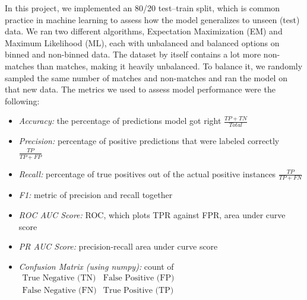 \documentclass{article}
\begin{document}
In this project, we implemented an 80/20 test–train split, which is common practice in machine learning to assess how the model generalizes to unseen (test) data. We ran two different algorithms, Expectation Maximization (EM) and Maximum Likelihood (ML), each with unbalanced and balanced options on binned and non-binned data. The dataset by itself contains a lot more non-matches than matches, making it heavily unbalanced. To balance it, we randomly sampled the same number of matches and non-matches and ran the model on that new data. The metrics we used to assess model performance were the following: 
\begin{itemize}
    \item\emph{Accuracy:} the percentage of predictions model got right $\frac{TP + TN}{Total}$
    \item\emph{Precision:} percentage of positive predictions that were labeled correctly $\frac{TP}{TP + FP}$
    \item\emph{Recall:} percentage of true positives out of the actual positive instances $\frac{TP}{TP+FN}$
    \item\emph{F1:} metric of precision and recall together 
    \item\emph{ROC AUC Score:} ROC, which plots TPR against FPR, area under curve score
    \item\emph{PR AUC Score:} precision-recall area under curve score 
    \item\emph{Confusion Matrix (using numpy):} count of $\begin{smallmatrix}\text{True Negative (TN)} & \text{False Positive (FP)} \\ \text{False Negative (FN)} & \text{True Positive (TP)}\end{smallmatrix}$ 
\end{itemize}
\end{document}
